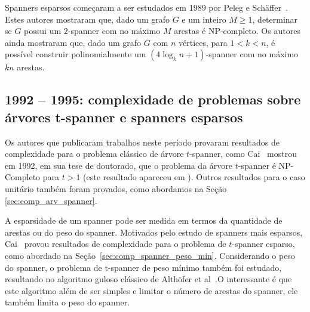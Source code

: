 Spanners esparsos começaram a ser estudados em 1989 por Peleg e Schäffer~\cite{PelegS1989}. Estes autores mostraram que, dado um grafo $G$ e um inteiro $M \ge 1$, determinar se $G$ possui um $2$-spanner com no máximo $M$ arestas é NP-completo. Os autores ainda mostraram que, dado um grafo $G$ com $n$ vértices, para $1 < k < n$, é possível construir polinomialmente um $(4 \log_{k}n + 1)$-spanner com no máximo $kn$ arestas.

\subsection{1992 -- 1995: complexidade de problemas sobre árvores t-spanner e spanners esparsos}
Os autores que publicaram trabalhos neste período 
provaram resultados de complexidade para o problema
clássico de árvore $t$-spanner, como
Cai~\cite{Cai1992} mostrou em 1992, em sua tese de doutorado, que o problema da 
árvore $t$-spanner é NP-Completo para $t > 1$ (este resultado apareceu em 
\cite{CaiC1995}). Outros resultados para o caso unitário também foram provados,
como abordamos na Seção \ref{sec:comp_arv_spanner}.


A esparsidade de um spanner pode ser medida em termos da quantidade de arestas
  ou do peso do spanner. 
Motivados pelo estudo de spanners mais esparsos, Cai~\cite{Cai1994} provou
resultados de complexidade para o problema de $t$-spanner esparso, como
abordado na Seção~\ref{sec:comp_spanner_peso_min}. Considerando o peso
do spanner, o problema de t-spanner de peso mínimo também foi estudado,
resultando no algoritmo guloso clássico de Alth\"{o}fer et
al~\cite{AlthoferDDJS1993}.O interessante é que este algoritmo além de
ser simples e limitar o número de arestas do spanner, ele também limita
o peso do spanner.



